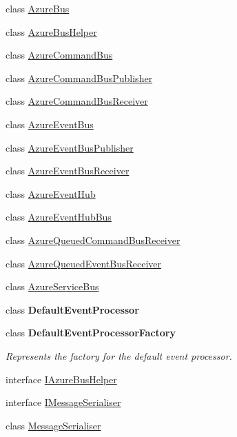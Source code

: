 \begin{DoxyCompactItemize}
\item 
class \hyperlink{classCqrs_1_1Azure_1_1ServiceBus_1_1AzureBus}{Azure\+Bus}
\item 
class \hyperlink{classCqrs_1_1Azure_1_1ServiceBus_1_1AzureBusHelper}{Azure\+Bus\+Helper}
\item 
class \hyperlink{classCqrs_1_1Azure_1_1ServiceBus_1_1AzureCommandBus}{Azure\+Command\+Bus}
\item 
class \hyperlink{classCqrs_1_1Azure_1_1ServiceBus_1_1AzureCommandBusPublisher}{Azure\+Command\+Bus\+Publisher}
\item 
class \hyperlink{classCqrs_1_1Azure_1_1ServiceBus_1_1AzureCommandBusReceiver}{Azure\+Command\+Bus\+Receiver}
\item 
class \hyperlink{classCqrs_1_1Azure_1_1ServiceBus_1_1AzureEventBus}{Azure\+Event\+Bus}
\item 
class \hyperlink{classCqrs_1_1Azure_1_1ServiceBus_1_1AzureEventBusPublisher}{Azure\+Event\+Bus\+Publisher}
\item 
class \hyperlink{classCqrs_1_1Azure_1_1ServiceBus_1_1AzureEventBusReceiver}{Azure\+Event\+Bus\+Receiver}
\item 
class \hyperlink{classCqrs_1_1Azure_1_1ServiceBus_1_1AzureEventHub}{Azure\+Event\+Hub}
\item 
class \hyperlink{classCqrs_1_1Azure_1_1ServiceBus_1_1AzureEventHubBus}{Azure\+Event\+Hub\+Bus}
\item 
class \hyperlink{classCqrs_1_1Azure_1_1ServiceBus_1_1AzureQueuedCommandBusReceiver}{Azure\+Queued\+Command\+Bus\+Receiver}
\item 
class \hyperlink{classCqrs_1_1Azure_1_1ServiceBus_1_1AzureQueuedEventBusReceiver}{Azure\+Queued\+Event\+Bus\+Receiver}
\item 
class \hyperlink{classCqrs_1_1Azure_1_1ServiceBus_1_1AzureServiceBus}{Azure\+Service\+Bus}
\item 
class {\bfseries Default\+Event\+Processor}
\item 
class {\bfseries Default\+Event\+Processor\+Factory}
\begin{DoxyCompactList}\small\item\em Represents the factory for the default event processor. \end{DoxyCompactList}\item 
interface \hyperlink{interfaceCqrs_1_1Azure_1_1ServiceBus_1_1IAzureBusHelper}{I\+Azure\+Bus\+Helper}
\item 
interface \hyperlink{interfaceCqrs_1_1Azure_1_1ServiceBus_1_1IMessageSerialiser}{I\+Message\+Serialiser}
\item 
class \hyperlink{classCqrs_1_1Azure_1_1ServiceBus_1_1MessageSerialiser}{Message\+Serialiser}
\end{DoxyCompactItemize}
